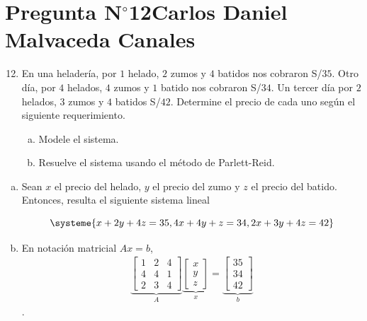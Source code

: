 \section{Pregunta N$^{\circ}$12\qquad Carlos Daniel Malvaceda Canales}

\begin{frame}
	\begin{enumerate}\setcounter{enumi}{11}
		\item

		      En una heladería, por $1$ helado, $2$ zumos y $4$ batidos
		      nos cobraron S/$35$.
		      Otro día, por $4$ helados, $4$ zumos y $1$ batido nos
		      cobraron S/$34$.
		      Un tercer día por $2$ helados, $3$ zumos y $4$ batidos
		      S/$42$.
		      Determine el precio de cada uno según el siguiente
		      requerimiento.

		      \begin{enumerate}[a)]
			      \item

			            Modele el sistema.

			      \item
			            Resuelve el sistema usando el método de Parlett-Reid.
		      \end{enumerate}

	\end{enumerate}

	\begin{solution}
		\begin{enumerate}[a)]
			\item

			      Sean $x$ el precio del helado, $y$ el precio del zumo y $z$ el
			      precio del batido.
			      Entonces, resulta el siguiente sistema lineal

			      \begin{equation*}
				      \systeme{
					      x+2y+4z=35,
					      4x+4y+z=34,
					      2x+3y+4z=42
				      }
			      \end{equation*}
			\item

			      En notación matricial $Ax=b$,
			      \begin{align*}
				      \underbrace{
					      \begin{bmatrix}
						      1 & 2 & 4 \\
						      4 & 4 & 1 \\
						      2 & 3 & 4
					      \end{bmatrix}
				      }_{A}
				      \underbrace{
					      \begin{bmatrix}
						      x \\
						      y \\
						      z
					      \end{bmatrix}
				      }_{x}=
				      \underbrace{
					      \begin{bmatrix}
						      35 \\
						      34 \\
						      42
					      \end{bmatrix}
				      }_{b}
			      \end{align*}.


\end{enumerate}
\end{solution}
\end{frame}
